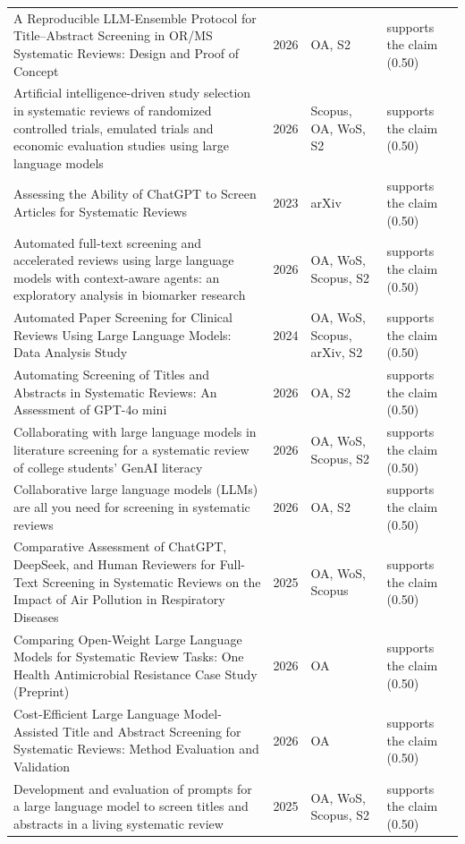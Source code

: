 \begin{longtable}{@{}%
  >{\raggedright\arraybackslash}p{}c%
  >{\raggedright\arraybackslash}p{}%
  >{\raggedright\arraybackslash}p{}@{}}
A Reproducible LLM-Ensemble Protocol for Title--Abstract Screening in OR/MS Systematic Reviews: Design and Proof of Concept & 2026 & OA, S2 & supports the claim (0.50) \\
Artificial intelligence-driven study selection in systematic reviews of randomized controlled trials, emulated trials and economic evaluation studies using large language models & 2026 & Scopus, OA, WoS, S2 & supports the claim (0.50) \\
Assessing the Ability of ChatGPT to Screen Articles for Systematic Reviews & 2023 & arXiv & supports the claim (0.50) \\
Automated full-text screening and accelerated reviews using large language models with context-aware agents: an exploratory analysis in biomarker research & 2026 & OA, WoS, Scopus, S2 & supports the claim (0.50) \\
Automated Paper Screening for Clinical Reviews Using Large Language Models: Data Analysis Study & 2024 & OA, WoS, Scopus, arXiv, S2 & supports the claim (0.50) \\
Automating Screening of Titles and Abstracts in Systematic Reviews: An Assessment of GPT-4o mini & 2026 & OA, S2 & supports the claim (0.50) \\
Collaborating with large language models in literature screening for a systematic review of college students' GenAI literacy & 2026 & OA, WoS, Scopus, S2 & supports the claim (0.50) \\
Collaborative large language models (LLMs) are all you need for screening in systematic reviews & 2026 & OA, S2 & supports the claim (0.50) \\
Comparative Assessment of ChatGPT, DeepSeek, and Human Reviewers for Full-Text Screening in Systematic Reviews on the Impact of Air Pollution in Respiratory Diseases & 2025 & OA, WoS, Scopus & supports the claim (0.50) \\
Comparing Open-Weight Large Language Models for Systematic Review Tasks: One Health Antimicrobial Resistance Case Study (Preprint) & 2026 & OA & supports the claim (0.50) \\
Cost-Efficient Large Language Model-Assisted Title and Abstract Screening for Systematic Reviews: Method Evaluation and Validation & 2026 & OA & supports the claim (0.50) \\
Development and evaluation of prompts for a large language model to screen titles and abstracts in a living systematic review & 2025 & OA, WoS, Scopus, S2 & supports the claim (0.50) \\

\end{longtable}
